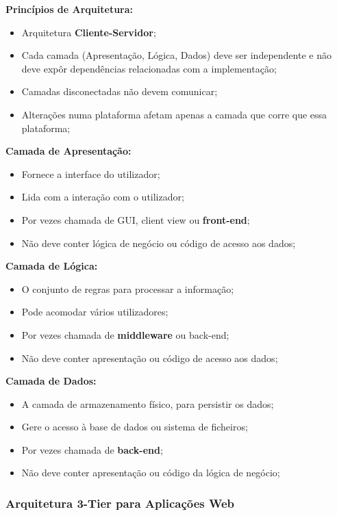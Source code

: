 \documentclass{article}
\begin{document}
\begin{flushleft}
  \textbf{Princípios de Arquitetura:}
  \begin{itemize}
    \item Arquitetura \textbf{Cliente-Servidor};
    \item Cada camada (Apresentação, Lógica, Dados) deve ser independente e não deve
    expôr dependências relacionadas com a implementação;
    \item Camadas disconectadas não devem comunicar;
    \item Alterações numa plataforma afetam apenas a camada que corre que essa plataforma;
  \end{itemize}

  \textbf{Camada de Apresentação:}
  \begin{itemize}
    \item Fornece a interface do utilizador;
    \item Lida com a interação com o utilizador;
    \item Por vezes chamada de GUI, client view ou \textbf{front-end};
    \item Não deve conter lógica de negócio ou código de acesso aos dados;
  \end{itemize}

  \textbf{Camada de Lógica:}
  \begin{itemize}
    \item O conjunto de regras para processar a informação;
    \item Pode acomodar vários utilizadores;
    \item Por vezes chamada de \textbf{middleware} ou back-end;
    \item Não deve conter apresentação ou código de acesso aos dados;
  \end{itemize}

  \textbf{Camada de Dados:}
  \begin{itemize}
    \item A camada de armazenamento físico, para persistir os dados;
    \item Gere o acesso à base de dados ou sistema de ficheiros;
    \item Por vezes chamada de \textbf{back-end};
    \item Não deve conter apresentação ou código da lógica de negócio;
  \end{itemize}
\end{flushleft}

\subsubsection{Arquitetura 3-Tier para Aplicações Web}
\end{document}
